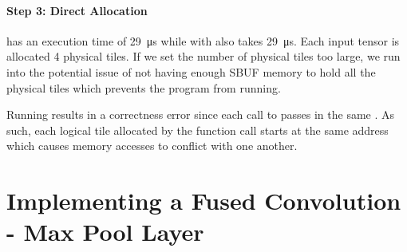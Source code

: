 \documentclass[11pt]{article}
\begin{document}
\paragraph{Step 3: Direct Allocation}

 has an execution time of
\SI{29}{\micro\second} while  with 
also takes \SI{29}{\micro\second}. Each input tensor is allocated 4 physical
tiles. If we set the number of physical tiles too large, we run into the
potential issue of not having enough SBUF memory to hold all the physical tiles
which prevents the program from running.

\smallskip
Running  results in a correctness
error since each call to  passes in the same
. As such, each logical tile allocated by the function call
starts at the same address which causes memory accesses to conflict with one
another.

\section{Implementing a Fused Convolution - Max Pool Layer}
\end{document}
